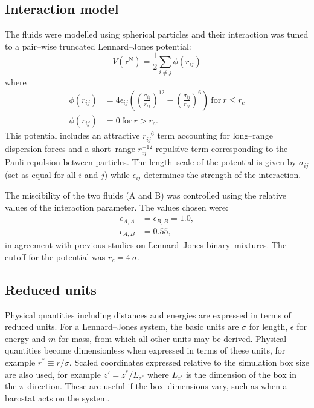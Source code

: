 \subsection{Interaction model}\label{InteractionModel}
The fluids were modelled using spherical particles and their interaction was tuned to a pair--wise truncated Lennard--Jones potential:
\begin{equation}
V \left( \mathbf{r}^{\mathrm{N}} \right) = \frac{1}{2} \sum_{i\neq j} \phi \left( r_{ij} \right)
\end{equation}
where
\begin{align}
\label{LJ}
\phi \left( r_{ij} \right) &= 4 \epsilon_{ij} \left( \left( \frac{\sigma_{ij}}{r_{ij}}\right)^{12} - \left( \frac{\sigma_{ij}}{r_{ij}}\right)^{6} \right)\ \mathrm{for}\ r \leq r_{c}\\
\phi \left( r_{ij} \right) &= 0\ \mathrm{for}\ r > r_{c}.
\end{align}
This potential includes an attractive $r_{ij}^{-6}$ term accounting for long--range dispersion forces and a short--range $r_{ij}^{-12}$ repulsive term corresponding to the Pauli repulsion between particles.
The length--scale of the potential is given by $\sigma_{ij}$ (set as equal for all $i$ and $j$) while $\epsilon_{ij}$ determines the strength of the interaction. 

The miscibility of the two fluids (A and B) was controlled using the relative values of the interaction parameter.
The values chosen were:
\begin{align}
\epsilon_{A,A} &= \epsilon_{B,B} = 1.0,\\
\epsilon_{A,B} &= 0.55,
\end{align}
in agreement with previous studies on Lennard--Jones binary--mixtures.\cite{MorenzoRazo,Blas,HolgerBoppHampe}
The cutoff for the potential was $r_{c} = 4\ \sigma$.

\subsection{Reduced units}\label{ReducedUnits}
Physical quantities including distances and energies are expressed in terms of reduced units.
For a Lennard--Jones system, the basic units are $\sigma$ for length, $\epsilon$ for energy and $m$ for mass, from which all other units may be derived.\cite{FrenkelSmit}
Physical quantities become dimensionless when expressed in terms of these units, for example $r^{*} \equiv r / \sigma$.
Scaled coordinates expressed relative to the simulation box size are also used, for example $z' = z^{*} / L_{z^{*}}$ where $L_{z^{*}}$ is the dimension of the box in the z--direction.
These are useful if the box--dimensions vary, such as when a barostat acts on the system.

